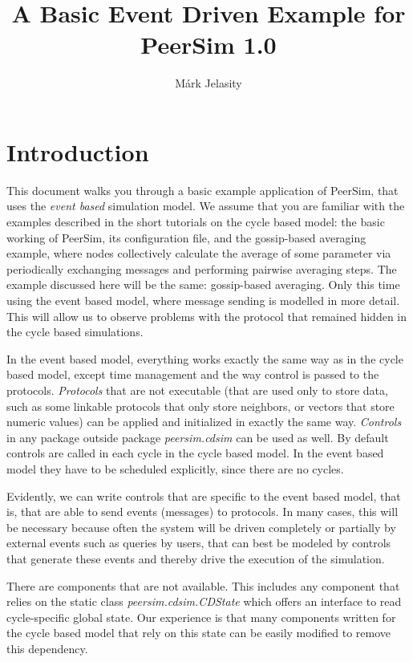\documentclass[a4paper,11pt]{article}
\title{A Basic Event Driven Example for PeerSim 1.0}
\author{M\'ark Jelasity}
\begin{document}
\maketitle

\section{Introduction}

This document walks you through a basic example application of PeerSim,
that uses the \emph{event based} simulation model.
We assume that you are familiar with the examples described in
the short tutorials on the cycle based model: the basic working
of PeerSim, its configuration file, and the gossip-based averaging example,
where nodes collectively calculate the average of some parameter via
periodically exchanging messages and performing pairwise averaging steps.
The example discussed here will be the same: gossip-based averaging.
Only this time using the event based model, where message sending is modelled
in more detail.
This will allow us to observe problems with the protocol that remained hidden
in the cycle based simulations.

In the event based model, everything works exactly the same way as in the
cycle based model, except time management and the way control is passed to
the protocols.
\emph{Protocols} that are not executable (that are used only to store
data, such as some linkable protocols that only store neighbors, or vectors that
store numeric values) can be applied and initialized in exactly the same way.
\emph{Controls} in any package outside package \emph{peersim.cdsim} can
be used as well. By default controls are called in each cycle in the cycle
based model. In the event based model they have to be scheduled explicitly,
since there are no cycles.

Evidently, we can write controls that are specific to the event based model,
that is, that are able to send events (messages) to protocols.
In many cases, this will be necessary because often the system will be
driven completely or partially by external events such as queries by users,
that can best be
modeled by controls that generate these events and thereby drive the
execution of the simulation.

There are components that are not available.
This includes any component that relies on the static class
\emph{peersim.cdsim.CDState} which offers an interface to read cycle-specific
global state.
Our experience is that many components written for the cycle based model
that rely on this state can be easily modified to remove this dependency.
\end{document}
